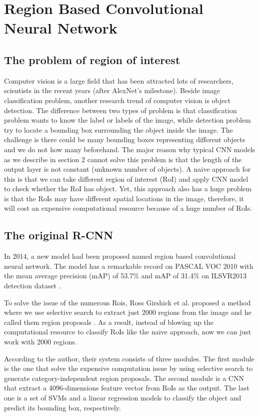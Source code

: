 \chapter{Region Based Convolutional Neural Network}
\section{The problem of region of interest}
\noindent
	Computer vision is a large field that has been attracted lots of researchers, scientists in the recent years (after AlexNet’s milestone). Beside image classification problem, another research trend of computer vision is object detection. The difference between two types of problem is that classification problem wants to know the label or labels of the image, while detection problem try to locate a bounding box surrounding the object inside the image. The challenge is there could be many bounding boxes representing different objects and we do not how many beforehand. The major reason why typical CNN models as we describe in section 2 cannot solve this problem is that the length of the output layer is not constant (unknown number of objects). A naive approach for this is that we can take different region of interest (RoI) and apply CNN model to check whether the RoI has object. Yet, this approach also has a huge problem is that the RoIs may have different spatial locations in the image, therefore, it will cost an expensive computational resource because of a huge number of RoIs.
	
\section{The original R-CNN}
\noindent

	In 2014, a new model had been proposed named region based convolutional neural network. The model has a remarkable record on PASCAL VOC 2010 with the mean average precision (mAP) of 53.7\% and mAP of 31.4\% on ILSVR2013 detection dataset \cite{rcnn}.
	
	To solve the issue of the numerous Rois, Ross Girshick et al. proposed a method where we use selective search to extract just 2000 regions from the image and he called them region proposals \cite{rcnn}. As a result, instead of blowing up the computational resource to classify RoIs like the naive approach, now we can just work with 2000 regions.
	
	According to the author, their system consists of three modules. The first module is the one that solve the expensive computation issue by using selective search to generate category-independent region proposals. The second module is a CNN that extract a 4096-dimensions feature vector from RoIs as the output. The last one is a set of SVMs and a linear regression models to classify the object and predict its bounding box, respectively.
	
